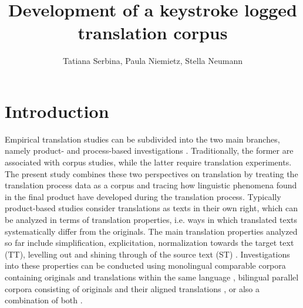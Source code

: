 \documentclass[output=paper]{LSP/langsci}
\author{Tatiana Serbina, Paula Niemietz, Stella Neumann}
\title{Development of a keystroke logged translation corpus}
\begin{document}
 
\section{Introduction}
Empirical translation studies can be subdivided into the two main branches, namely product- and process-based investigations \citep[see][]{Laviosa2002,Göpferich2008}. Traditionally, the former are associated with corpus studies, while the latter require translation experiments. The present study combines these two perspectives on translation by treating the translation process data as a corpus and tracing how linguistic phenomena found in the final product have developed during the translation process.
Typically product-based studies consider translations as texts in their own right, which can be analyzed in terms of translation properties, i.e. ways in which translated texts systematically differ from the originals. The main translation properties analyzed so far include simplification, explicitation, normalization towards the target text (TT), levelling out \citep{Baker1996} and shining through of the source text (ST) \citep{Teich2003}. Investigations into these properties can be conducted using monolingual comparable corpora containing originals and translations within the same language \citep[e.g.][]{Laviosa2002}, bilingual parallel corpora consisting of originals and their aligned translations \citep{Becher2010}, or also a combination of both \citep{Culo2012,Hansen-Schirra2012}.
\end{document}
